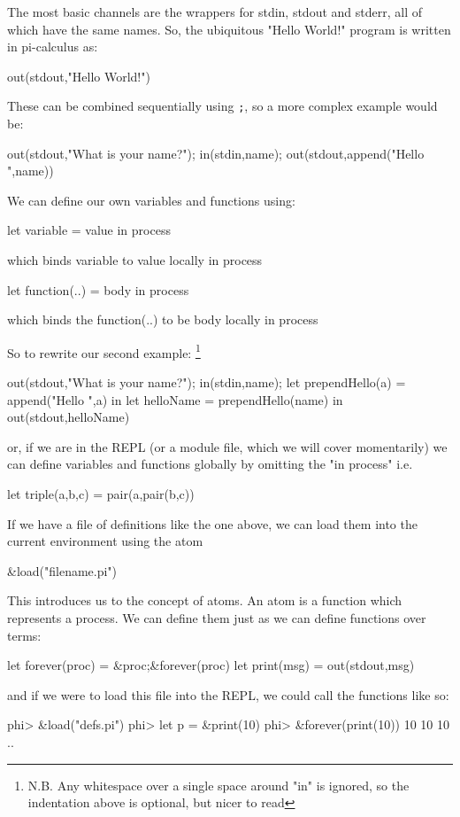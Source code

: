 The most basic channels are the wrappers for stdin, stdout and stderr, all of which have the same names. So, the ubiquitous "Hello World!" program is written in pi-calculus as:
\begin{code}
    out(stdout,"Hello World!")
\end{code}

These can be combined sequentially using \verb!;!, so a more complex example would be:
\begin{code}
    out(stdout,"What is your name?");
    in(stdin,name);
    out(stdout,append("Hello ",name))
\end{code}

We can define our own variables and functions using:
\begin{code}
    let variable = value in process
\end{code}
which binds variable to value locally in process

\begin{code}
    let function(..) = body in process 
\end{code}
which binds the function(..) to be body locally in process

So to rewrite our second example: \footnote{N.B. Any whitespace over a single space around "in" is ignored, so the indentation above is optional, but nicer to read}
\begin{code}
    out(stdout,"What is your name?");
    in(stdin,name);
    let prependHello(a) = append("Hello ",a) in
        let helloName = prependHello(name) in
            out(stdout,helloName)
\end{code}


or, if we are in the REPL (or a module file, which we will cover momentarily) we can define variables and functions globally by omitting the "in process"
i.e.
\begin{code}
    let triple(a,b,c) = pair(a,pair(b,c))
\end{code}


If we have a file of definitions like the one above, we can load them into the current environment using the atom 
\begin{code}
    &load("filename.pi")
\end{code}

This introduces us to the concept of atoms. An atom is a function which represents a process. We can define them just as we can define functions over terms:
\begin{code}
    let forever(proc) = &proc;&forever(proc)
    let print(msg)    = out(stdout,msg)     
\end{code}

and if we were to load this file into the REPL, we could call the functions like so:
\begin{code}
    phi> &load("defs.pi")
    phi> let p = &print(10)
    phi> &forever(print(10))
    10
    10
    10
    ..
\end{code}



